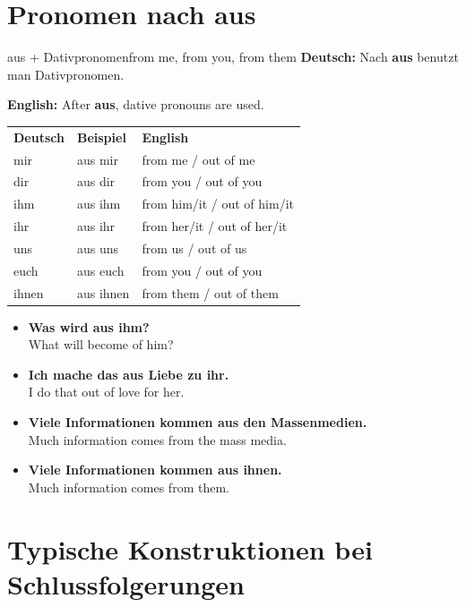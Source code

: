 \documentclass[a4paper,11pt]{article}
\newcommand{\GermanText}[1]{\textbf{Deutsch: }#1\par}
\newcommand{\EnglishText}[1]{{\small\color{SoftGray}\textbf{English: }#1\par}}
\newcommand{\ExampleItem}[2]{\item \textbf{#1}\\{\small\color{SoftGray}#2}}
\begin{document}
\section{Pronomen nach \glqq aus\grqq}

\begin{grammarentry}{aus + Dativpronomen}{from me, from you, from them}
\GermanText{Nach \textbf{aus} benutzt man Dativpronomen.}
\EnglishText{After \textbf{aus}, dative pronouns are used.}
\end{grammarentry}

\begin{longtable}{p{3.5cm}|p{4.5cm}|p{6cm}}
\rowcolor{HeaderBlueDark}
\color{white}\textbf{Deutsch} &
\color{white}\textbf{Beispiel} &
\color{white}\textbf{English} \\
mir & aus mir & from me / out of me \\
dir & aus dir & from you / out of you \\
ihm & aus ihm & from him/it / out of him/it \\
ihr & aus ihr & from her/it / out of her/it \\
uns & aus uns & from us / out of us \\
euch & aus euch & from you / out of you \\
ihnen & aus ihnen & from them / out of them \\
\end{longtable}

\begin{exbox}
\begin{itemize}
\ExampleItem{Was wird aus ihm?}{What will become of him?}
\ExampleItem{Ich mache das aus Liebe zu ihr.}{I do that out of love for her.}
\ExampleItem{Viele Informationen kommen aus den Massenmedien.}{Much information comes from the mass media.}
\ExampleItem{Viele Informationen kommen aus ihnen.}{Much information comes from them.}
\end{itemize}
\end{exbox}

\section{Typische Konstruktionen bei Schlussfolgerungen}
\end{document}
